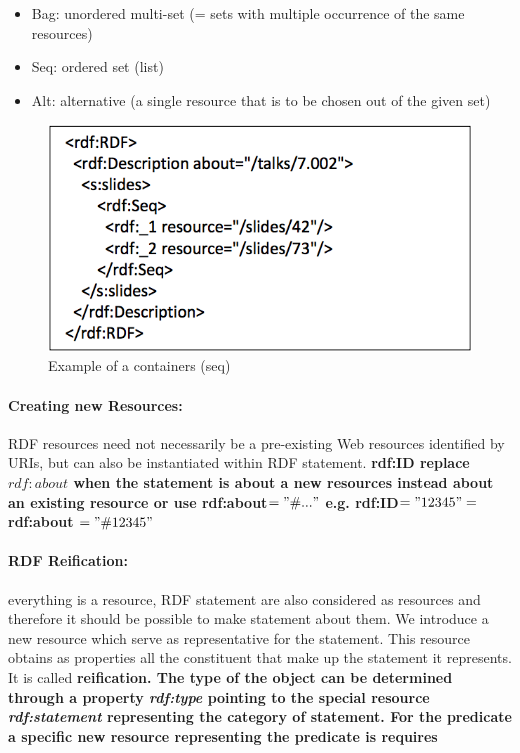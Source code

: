\begin{itemize}
\item Bag: unordered multi-set (= sets with multiple occurrence of the same resources)
\item Seq: ordered set (list)
\item Alt: alternative (a single resource that is to be chosen out of the given set)
\end{itemize}

\begin{figure}[H]
\begin{center}
\includegraphics[width=1\linewidth]{figures/container.png}
\end{center}
\caption{Example of a containers (seq)}
\end{figure}

\paragraph{Creating new Resources:} RDF resources need not necessarily be a pre-existing Web resources identified by URIs, but can also be instantiated within RDF statement. \bf{rdf:ID} replace $rdf:about$ when the statement is about a new resources instead about an existing resource or use rdf:about$="\#..."$ e.g. rdf:ID$="12345" = $rdf:about $="\#12345"$

\paragraph{RDF Reification:} everything is a resource, RDF statement are also considered as resources and therefore it should be possible to make statement about them. We introduce a new resource which serve as representative for the statement. This resource obtains as properties all the constituent that make up the statement it represents. It is called \bf{reification}. The type of the object can be determined through a property \textit{rdf:type} pointing to the special resource \textit{rdf:statement} representing the category of statement. For the predicate a specific new resource representing the predicate is requires

